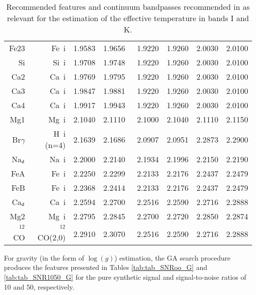 \begin{table}
\begin{center}
\begin{tabular}{rrrrrrrr}
Fe23        & Fe{~\sc i}     & 1.9583 & 1.9656~& 1.9220 & 1.9260 & 2.0030 & 2.0100 \\
Si          & Si{~\sc i}     & 1.9708 & 1.9748~& 1.9220 & 1.9260 & 2.0030 & 2.0100 \\
Ca2         & Ca{~\sc i}     & 1.9769 & 1.9795~& 1.9220 & 1.9260 & 2.0030 & 2.0100 \\
Ca3         & Ca{~\sc i}     & 1.9847 & 1.9881~& 1.9220 & 1.9260 & 2.0030 & 2.0100 \\
Ca4         & Ca{~\sc i}     & 1.9917 & 1.9943~& 1.9220 & 1.9260 & 2.0030 & 2.0100 \\
Mg1         & Mg{~\sc i}     & 2.1040 & 2.1110~& 2.1000 & 2.1040 & 2.1110 & 2.1150 \\
Br$\gamma$  & H{~\sc i} (n=4)& 2.1639 & 2.1686~& 2.0907 & 2.0951 & 2.2873 & 2.2900 \\
Na$_{\rm d}$& Na{~\sc i}     & 2.2000 & 2.2140~& 2.1934 & 2.1996  & 2.2150 & 2.2190   \\
FeA         & Fe{~\sc i}     & 2.2250 & 2.2299~& 2.2133 & 2.2176 & 2.2437 & 2.2479 \\
FeB         & Fe{~\sc i}     & 2.2368 & 2.2414~& 2.2133 & 2.2176 & 2.2437 & 2.2479 \\
Ca$_{\rm d}$& Ca{~\sc i}     & 2.2594 & 2.2700~& 2.2516 & 2.2590  & 2.2716 & 2.2888   \\
Mg2         & Mg{~\sc i}     & 2.2795 & 2.2845~& 2.2700 & 2.2720 & 2.2850 & 2.2874 \\
$^{12}$CO   & $^{12}$CO(2,0) & 2.2910 & 2.3070~& 2.2516 & 2.2590   & 2.2716 & 2.2888   \\
\hline
\end{tabular}
\caption {Recommended features and continuum bandpasses recommended in 
   \cite{2013A&A...549A.129C} as relevant for the estimation of the
   effective temperature in bands I and K.} \label{tab:tab_cesetti}
\end{center}
\end{table}


For gravity (in the form of $\log(g)$) estimation, the GA search
procedure produces the features presented in
Tables \ref{tab:tab_SNRoo_G} and \ref{tab:tab_SNR1050_G} for the pure
synthetic signal and signal-to-noise ratios of 10 and 50,
respectively.

